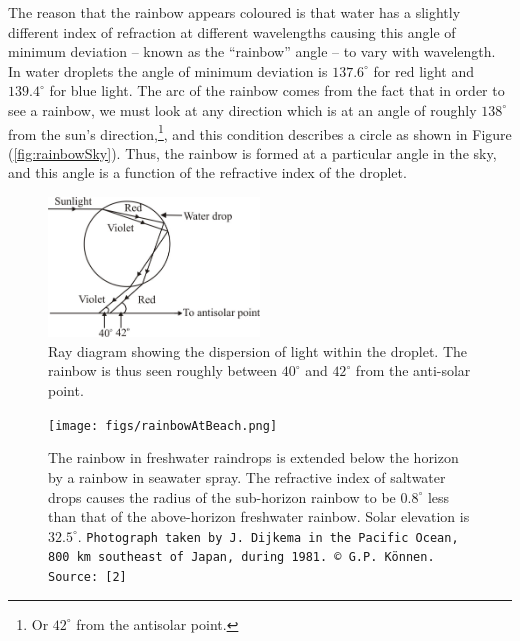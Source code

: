The reason that the rainbow appears coloured is that water has a slightly different index of refraction at different wavelengths causing this angle of minimum deviation -- known as the ``rainbow'' angle -- to vary with wavelength. In water droplets the angle of minimum deviation is $137.6^\circ$ for red light and $139.4^\circ$ for blue light. The arc of the rainbow comes from the fact that in order to see a rainbow, we must look at any direction which is at an angle of roughly $138^\circ$ from the sun's direction,\footnote{Or $42^\circ$ from the antisolar point.}, and this condition describes a circle as shown in Figure (\ref{fig:rainbowSky}). Thus, the rainbow is formed at a particular angle in the sky, and this angle is a function of the refractive index of the droplet.


\begin{figure}[!htb]
    \centering
    \includegraphics[width=0.5\textwidth]{figs/img1.jpg}
    \caption{Ray diagram showing the dispersion of light within the droplet. The rainbow is thus seen roughly between $40^\circ$ and $42^\circ$ from the anti-solar point.}
    \label{fig:dispersionInDrop}
\end{figure}


\begin{figure}[!htb ]
    \centering
    \texttt{[image: figs/rainbowAtBeach.png]}
    \caption{The rainbow in freshwater raindrops is extended below the horizon by a rainbow in seawater spray. The refractive index of saltwater drops causes the radius of the sub-horizon rainbow to be $0.8^\circ$ less than that of the above-horizon freshwater rainbow. Solar elevation is $32.5^\circ$. \texttt{Photograph taken by J. Dijkema in the Pacific Ocean, 800 km southeast of Japan, during 1981. © G.P. Können. Source: [2]}}
    \label{fig:rainbowAtBeach}
\end{figure}


